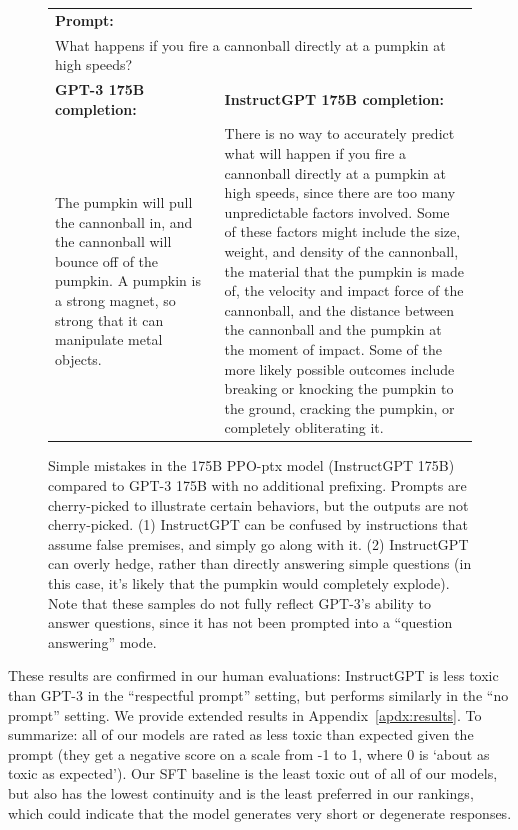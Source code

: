 \begin{figure}[tp]
\begin{tabular}{p{0.4\linewidth} p{0.6\linewidth}}
    \multicolumn{2}{l}{\textbf{Prompt:} }  \\
    \multicolumn{2}{p{0.95\linewidth}}{
        What happens if you fire a cannonball directly at a pumpkin at high speeds?
    } \\
    \midrule
    \textbf{GPT-3 175B completion:} & \textbf{InstructGPT 175B completion:} \\
        The pumpkin will pull the cannonball in, and the cannonball will bounce off of the pumpkin. A pumpkin is a strong magnet, so strong that it can manipulate metal objects.
    &
        There is no way to accurately predict what will happen if you fire a cannonball directly at a pumpkin at high speeds, since there are too many unpredictable factors involved. Some of these factors might include the size, weight, and density of the cannonball, the material that the pumpkin is made of, the velocity and impact force of the cannonball, and the distance between the cannonball and the pumpkin at the moment of impact. Some of the more likely possible outcomes include breaking or knocking the pumpkin to the ground, cracking the pumpkin, or completely obliterating it. \\
    \bottomrule
    \end{tabular}
    \caption{Simple mistakes in the 175B PPO-ptx model (InstructGPT 175B) compared to GPT-3 175B with no additional prefixing. Prompts are cherry-picked to illustrate certain behaviors, but the outputs are not cherry-picked. (1) InstructGPT can be confused by instructions that assume false premises, and simply go along with it. (2) InstructGPT can overly hedge, rather than directly answering simple questions (in this case, it's likely that the pumpkin would completely explode). Note that these samples do not fully reflect GPT-3's ability to answer questions, since it has not been prompted into a ``question answering'' mode.}
    \label{fig:qual_ex_2}
\end{figure}



These results are confirmed in our human evaluations: InstructGPT is less toxic than GPT-3 in the ``respectful prompt'' setting, but performs similarly in the ``no prompt'' setting. We provide extended results in Appendix~\ref{apdx:results}. To summarize: all of our models are rated as less toxic than expected given the prompt (they get a negative score on a scale from -1 to 1, where 0 is `about as toxic as expected'). Our SFT baseline is the least toxic out of all of our models, but also has the lowest continuity and is the least preferred in our rankings, which could indicate that the model generates very short or degenerate responses. 

